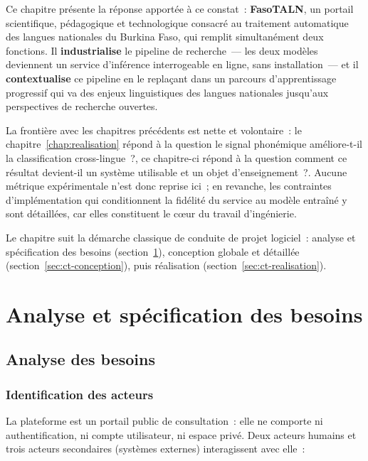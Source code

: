 Ce chapitre présente la réponse apportée à ce constat~: \textbf{FasoTALN}, un portail
scientifique, pédagogique et technologique consacré au traitement automatique des
langues nationales du Burkina Faso, qui remplit simultanément deux fonctions. Il
\textbf{industrialise} le pipeline de recherche~--- les deux modèles deviennent un
service d'inférence interrogeable en ligne, sans installation~--- et il
\textbf{contextualise} ce pipeline en le replaçant dans un parcours d'apprentissage
progressif qui va des enjeux linguistiques des langues nationales jusqu'aux
perspectives de recherche ouvertes.

La frontière avec les chapitres précédents est nette et volontaire~: le
chapitre~\ref{chap:realisation} répond à la question \og{}le signal phonémique
améliore-t-il la classification cross-lingue~?\fg{}, ce chapitre-ci répond à la
question \og{}comment ce résultat devient-il un système utilisable et un objet
d'enseignement~?\fg{}. Aucune métrique expérimentale n'est donc reprise ici~; en
revanche, les contraintes d'implémentation qui conditionnent la fidélité du service
au modèle entraîné y sont détaillées, car elles constituent le c\oe{}ur du travail
d'ingénierie.

Le chapitre suit la démarche classique de conduite de projet logiciel~: analyse et
spécification des besoins (section~\ref{sec:ct-besoins}), conception globale et
détaillée (section~\ref{sec:ct-conception}), puis réalisation
(section~\ref{sec:ct-realisation}).

\section{Analyse et spécification des besoins}
\label{sec:ct-besoins}

\subsection{Analyse des besoins}

\subsubsection{Identification des acteurs}

La plateforme est un portail public de consultation~: elle ne comporte ni
authentification, ni compte utilisateur, ni espace privé. Deux acteurs humains et
trois acteurs secondaires (systèmes externes) interagissent avec elle~:

